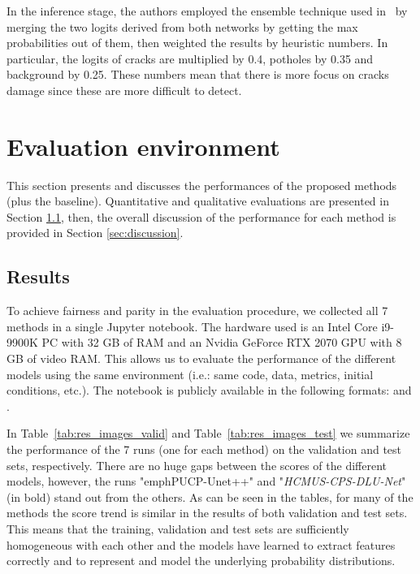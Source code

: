 \documentclass[twocolumn]{article}
\newcommand{\PUCP}[0]{PUCP}\newcommand{\HCMUS}[0]{HCMUS}\newcommand{\baseline}[0]{Baseline}
\newcommand{\Bhref}[3][blue]{\href{#2}{\color{#1}{#3}}}
\begin{document}
In the inference stage, the authors employed the ensemble technique used in~\cite{filipiak2021n} by merging the two logits derived from both networks by getting the max probabilities out of them, then weighted the results by heuristic numbers. In particular, the logits of cracks are multiplied by 0.4, potholes by 0.35 and background by 0.25. These numbers mean that there is more focus on cracks damage since these are more difficult to detect.





\section{Evaluation environment}
\label{sec:results_discussion}
This section presents and discusses the performances of the proposed methods (plus the baseline). Quantitative and qualitative evaluations are presented in Section \ref{sec:eval}, then, the overall discussion of the performance for each method is provided in Section  \ref{sec:discussion}.

\subsection{Results}
\label{sec:eval}
To achieve fairness and parity in the evaluation procedure, we collected all 7 methods in a single Jupyter notebook. The hardware used is an Intel Core i9-9900K PC with 32 GB of RAM and an Nvidia GeForce RTX 2070 GPU with 8 GB of video RAM. This allows us to evaluate the performance of the different models using the same environment (i.e.: same code, data, metrics, initial conditions, etc.). The notebook is publicly available in the following formats:  \Bhref{http://deeplearning.ge.imati.cnr.it/genova-5G/notebooks/shrec-2022-evaluation.html}{html} and \Bhref{http://deeplearning.ge.imati.cnr.it/genova-5G/notebooks/shrec-2022-evaluation.ipynb}{ipynb}. 

In Table~\ref{tab:res_images_valid} and Table~\ref{tab:res_images_test} we summarize the performance of the 7 runs (one for each method) on the validation and test sets, respectively. There are no huge gaps between the scores of the different models, however, the runs "emph{\PUCP{}-Unet++}" and "\emph{\HCMUS{}-CPS-DLU-Net}" (in bold) stand out from the others. As can be seen in the tables, for many of the methods the score trend is similar in the results of both validation and test sets. This means that the training, validation and test sets are sufficiently homogeneous with each other and the models have learned to extract features correctly and to represent and model the underlying probability distributions.
\end{document}
